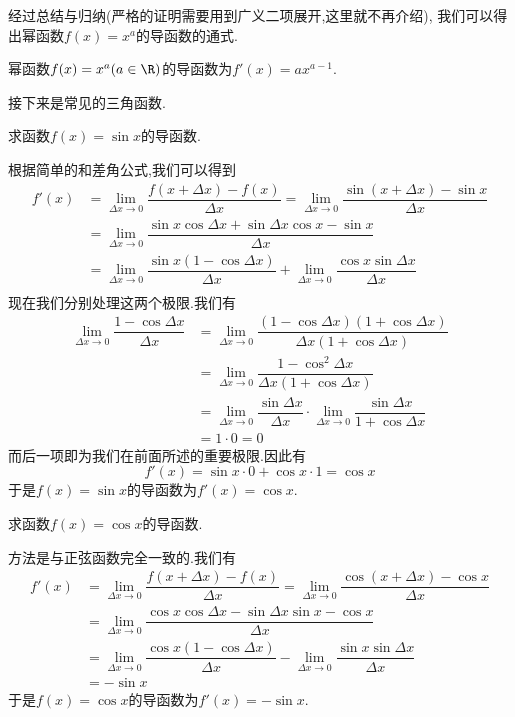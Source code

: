 \documentclass{ctexart}
\begin{document}
经过总结与归纳(严格的证明需要用到广义二项展开,这里就不再介绍),%
我们可以得出幂函数$f(x)=x^a$的导函数的通式.
\begin{theorem}[0A.2.2 幂函数的导数]
    幂函数$f(x)=x^a(a\in\R)$的导函数为$f'(x)=ax^{a-1}$.
\end{theorem}
接下来是常见的三角函数.
\begin{problem}[P.0A.6]
    求函数$f(x)=\sin x$的导函数.
\end{problem}
\begin{derivation}
    根据简单的和差角公式,我们可以得到
    \[\begin{aligned}
        f'(x)
        &= \lim_{\Delta x\to0}\dfrac{f(x+\Delta x)-f(x)}{\Delta x}=\lim_{\Delta x\to0}\dfrac{\sin(x+\Delta x)-\sin{x}}{\Delta x} \\
        &= \lim_{\Delta x\to0}\dfrac{\sin x\cos\Delta x+\sin\Delta x\cos x-\sin x}{\Delta x} \\
        &= \lim_{\Delta x\to0}\dfrac{\sin x(1-\cos\Delta x)}{\Delta x}+\lim_{\Delta x\to0}\dfrac{\cos x\sin\Delta x}{\Delta x} \\
    \end{aligned}\]
    现在我们分别处理这两个极限.我们有
    \[\begin{aligned}
        \lim_{\Delta x\to0}\dfrac{1-\cos\Delta x}{\Delta x}
        &= \lim_{\Delta x\to0}\dfrac{\left(1-\cos\Delta x\right)\left(1+\cos\Delta x\right)}{\Delta x\left(1+\cos\Delta x\right)} \\
        &= \lim_{\Delta x\to0}\dfrac{1-\cos^2\Delta x}{\Delta x\left(1+\cos\Delta x\right)} \\
        &= \lim_{\Delta x\to0}\dfrac{\sin\Delta x}{\Delta x}\cdot\lim_{\Delta x\to0}\dfrac{\sin\Delta x}{1+\cos\Delta x} \\
        &= 1\cdot0=0
    \end{aligned}\]
    而后一项即为我们在前面所述的重要极限.因此有
    \[f'(x)=\sin x\cdot 0+\cos x\cdot 1=\cos x\]
    于是$f(x)=\sin x$的导函数为$f'(x)=\cos x$.
\end{derivation}
\begin{problem}[P.0A.7]
    求函数$f(x)=\cos x$的导函数.
\end{problem}
\begin{derivation}
    方法是与正弦函数完全一致的.我们有
    \[\begin{aligned}
        f'(x)
        &= \lim_{\Delta x\to0}\dfrac{f(x+\Delta x)-f(x)}{\Delta x}=\lim_{\Delta x\to0}\dfrac{\cos(x+\Delta x)-\cos{x}}{\Delta x} \\
        &= \lim_{\Delta x\to0}\dfrac{\cos x\cos\Delta x-\sin\Delta x\sin x-\cos x}{\Delta x} \\
        &= \lim_{\Delta x\to0}\dfrac{\cos x(1-\cos\Delta x)}{\Delta x}-\lim_{\Delta x\to0}\dfrac{\sin x\sin\Delta x}{\Delta x} \\
        &= -\sin x
    \end{aligned}\]
    于是$f(x)=\cos x$的导函数为$f'(x)=-\sin x$.
\end{derivation}
\end{document}
